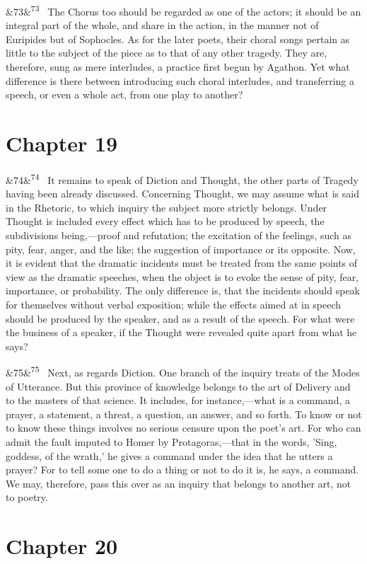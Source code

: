 \documentclass[12pt]{article}
\newcommand{\para}[1][]{\par\noindent\ifx&#1&\else\textsuperscript{\footnotesize #1}~\fi}
\begin{document}
\para[73] The Chorus too should be regarded as one of the actors; it should be an integral part of the whole, and share in the action, in the manner not of Euripides but of Sophocles. As for the later poets, their choral songs pertain as little to the subject of the piece as to that of any other tragedy. They are, therefore, sung as mere interludes, a practice first begun by Agathon. Yet what difference is there between introducing such choral interludes, and transferring a speech, or even a whole act, from one play to another?

\section*{Chapter 19}

\para[74] It remains to speak of Diction and Thought, the other parts of Tragedy having been already discussed. Concerning Thought, we may assume what is said in the Rhetoric, to which inquiry the subject more strictly belongs. Under Thought is included every effect which has to be produced by speech, the subdivisions being,---proof and refutation; the excitation of the feelings, such as pity, fear, anger, and the like; the suggestion of importance or its opposite. Now, it is evident that the dramatic incidents must be treated from the same points of view as the dramatic speeches, when the object is to evoke the sense of pity, fear, importance, or probability. The only difference is, that the incidents should speak for themselves without verbal exposition; while the effects aimed at in speech should be produced by the speaker, and as a result of the speech. For what were the business of a speaker, if the Thought were revealed quite apart from what he says?

\para[75] Next, as regards Diction. One branch of the inquiry treats of the Modes of Utterance. But this province of knowledge belongs to the art of Delivery and to the masters of that science. It includes, for instance,---what is a command, a prayer, a statement, a threat, a question, an answer, and so forth. To know or not to know these things involves no serious censure upon the poet's art. For who can admit the fault imputed to Homer by Protagoras,---that in the words, 'Sing, goddess, of the wrath,' he gives a command under the idea that he utters a prayer? For to tell some one to do a thing or not to do it is, he says, a command. We may, therefore, pass this over as an inquiry that belongs to another art, not to poetry.

\section*{Chapter 20}
\end{document}
